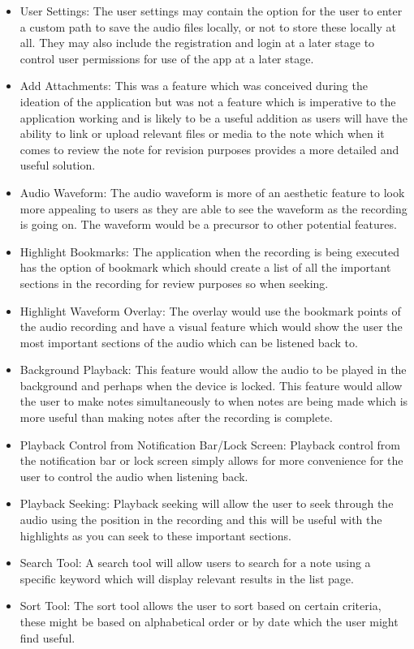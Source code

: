 \documentclass[oneside]{report}
\begin{document}
	\begin{itemize}
		\item User Settings: The user settings may contain the option for the user to enter a custom path to save the audio files locally, or not to store these locally at all. They may also include the registration and login at a later stage to control user permissions for use of the app at a later stage.
		\item Add Attachments: This was a feature which was conceived during the ideation of the application but was not a feature which is imperative to the application working and is likely to be a useful addition as users will have the ability to link or upload relevant files or media to the note which when it comes to review the note for revision purposes provides a more detailed and useful solution.
		\item Audio Waveform: The audio waveform is more of an aesthetic feature to look more appealing to users as they are able to see the waveform as the recording is going on. The waveform would be a precursor to other potential features.
		\item Highlight Bookmarks: The application when the recording is being executed has the option of bookmark which should create a list of all the important sections in the recording for review purposes so when seeking.
		\item Highlight Waveform Overlay: The overlay would use the bookmark points of the audio recording and have a visual feature which would show the user the most important sections of the audio which can be listened back to.
		\item Background Playback: This feature would allow the audio to be played in the background and perhaps when the device is locked. This feature would allow the user to make notes simultaneously to when notes are being made which is more useful than making notes after the recording is complete.
		\item Playback Control from Notification Bar/Lock Screen: Playback control from the notification bar or lock screen simply allows for more convenience for the user to control the audio when listening back.
		\item Playback Seeking: Playback seeking will allow the user to seek through the audio using the position in the recording and this will be useful with the highlights as you can seek to these important sections.
		\item Search Tool: A search tool will allow users to search for a note using a specific keyword which will display relevant results in the list page.
		\item Sort Tool: The sort tool allows the user to sort based on certain criteria, these might be based on alphabetical order or by date which the user might find useful.
	\end{itemize}
	
\end{document}
